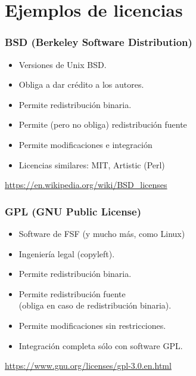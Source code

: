 \documentclass[17pt,aspectratio=169]{beamer}
\begin{document}
\section{Ejemplos de licencias}


\begin{frame}
\frametitle{BSD (Berkeley Software Distribution)}

\begin{itemize}
\item Versiones de Unix BSD.
\item Obliga a dar crédito a los autores.
\item Permite redistribución binaria.
\item Permite (pero no obliga) redistribución fuente
\item Permite modificaciones e integración
\item Licencias similares: MIT, Artistic (Perl)
\end{itemize}

\begin{flushright}
  {\small
    \url{https://en.wikipedia.org/wiki/BSD_licenses}
  }
\end{flushright}
\end{frame}


\begin{frame}
\frametitle{GPL (GNU Public License)}

\begin{itemize}
\item Software de FSF (y mucho más, como Linux)
\item Ingeniería legal (copyleft).
\item Permite redistribución binaria.
\item Permite redistribución fuente \\
  (obliga en caso de redistribución binaria).
\item Permite modificaciones sin restricciones.
\item Integración completa sólo con software GPL.
\end{itemize}

\begin{flushright}
  {\small
    \url{https://www.gnu.org/licenses/gpl-3.0.en.html}
  }
\end{flushright}

\end{frame}
\end{document}
